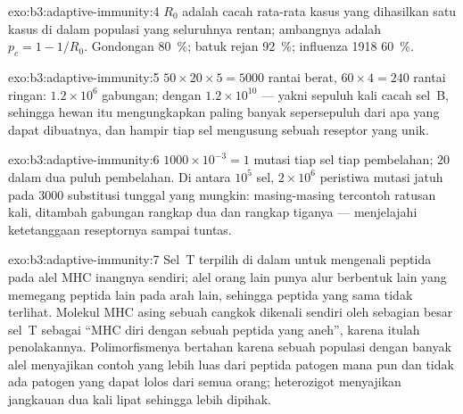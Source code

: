 \begin{solution}{exo:b3:adaptive-immunity:4}
$R_{0}$ adalah cacah rata-rata kasus yang dihasilkan satu kasus di dalam populasi
yang seluruhnya rentan; ambangnya adalah $p_{c} = 1 - 1/R_{0}$. Gondongan
\qty{80}{\%}; batuk rejan \qty{92}{\%}; influenza 1918 \qty{60}{\%}.
\end{solution}

\begin{solution}{exo:b3:adaptive-immunity:5}
$50\times 20\times 5 = 5000$ rantai berat, $60\times 4 = 240$ rantai ringan:
$1.2\times 10^{6}$ gabungan; dengan  $1.2\times
10^{10}$ --- yakni sepuluh kali cacah sel~B, sehingga hewan itu mengungkapkan
paling banyak sepersepuluh dari apa yang dapat dibuatnya, dan hampir tiap sel
mengusung sebuah reseptor yang unik.
\end{solution}

\begin{solution}{exo:b3:adaptive-immunity:6}
$1000\times 10^{-3} = 1$ mutasi tiap sel tiap pembelahan; $20$ dalam dua puluh
pembelahan. Di antara $10^{5}$ sel, $2\times 10^{6}$ peristiwa mutasi jatuh
pada $3000$ substitusi tunggal yang mungkin: masing-masing tercontoh ratusan
kali, ditambah gabungan rangkap dua dan rangkap tiganya --- 
menjelajahi ketetanggaan reseptornya sampai tuntas.
\end{solution}

\begin{solution}{exo:b3:adaptive-immunity:7}
Sel~T terpilih di dalam  untuk mengenali peptida pada alel MHC
inangnya sendiri; alel orang lain punya alur berbentuk lain
yang memegang peptida lain pada arah lain, sehingga
peptida  yang sama tidak terlihat. Molekul MHC asing sebuah cangkok
dikenali sendiri oleh sebagian besar sel~T sebagai ``MHC diri dengan
sebuah peptida yang aneh'', karena itulah penolakannya. Polimorfismenya bertahan karena
sebuah populasi dengan banyak alel menyajikan contoh yang lebih luas dari peptida
patogen mana pun dan tidak ada patogen yang dapat lolos dari semua orang; heterozigot
menyajikan jangkauan dua kali lipat sehingga lebih dipihak.
\end{solution}

